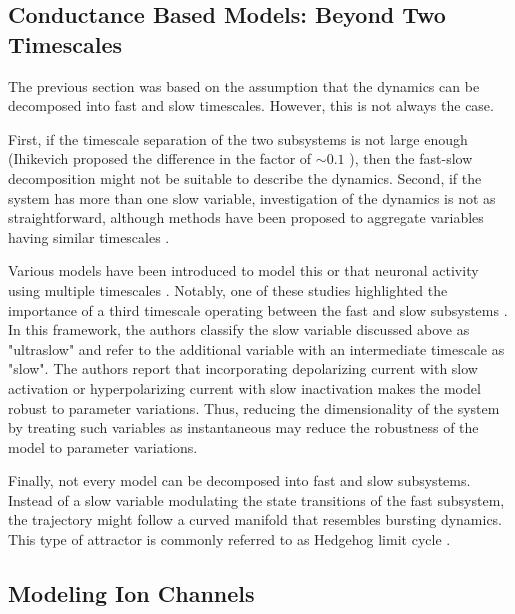 \documentclass[../main.tex]{subfiles}
\begin{document}
\subsection{Conductance Based Models: Beyond Two Timescales}

The previous section was based on the assumption that the dynamics can be decomposed into fast and slow timescales. However, this is not always the case.

First, if the timescale separation of the two subsystems is not large enough (Ihikevich proposed the difference in the factor of $\sim 0.1$ \parencite{izhikevichDynamicalSystemsNeuroscience2006,izhikevichDynamicalSystemsNeuroscience2006}), then the fast-slow decomposition might not be suitable to describe the dynamics. Second, if the system has more than one slow variable, investigation of the dynamics is not as straightforward, although methods have been proposed to aggregate variables having similar timescales \parencite{franciModelingModulationNeuronal2014}.

Various models have been introduced to model this or that neuronal activity using multiple timescales \parencite{fazliPhantomBurstingMay2020,franciRobustTunableBursting2018}. Notably, one of these studies highlighted the importance of a third timescale operating between the fast and slow subsystems \parencite{franciRobustTunableBursting2018}.  In this framework, the authors classify the slow variable discussed above as "ultraslow" and refer to the additional variable with an intermediate timescale as "slow". The authors report that incorporating depolarizing current with slow activation or hyperpolarizing current with slow inactivation makes the model robust to parameter variations. Thus, reducing the dimensionality of the system by treating such variables as instantaneous may reduce the robustness of the model to parameter variations.

Finally, not every model can be decomposed into fast and slow subsystems. Instead of a slow variable modulating the state transitions of the fast subsystem, the trajectory might follow a curved manifold that resembles bursting dynamics. This type of attractor is commonly referred to as Hedgehog limit cycle \parencite{izhikevichNEURALEXCITABILITYSPIKING2000}.


\subsection{Modeling Ion Channels} \label{subsec:modeling_ion_channels}
\end{document}
